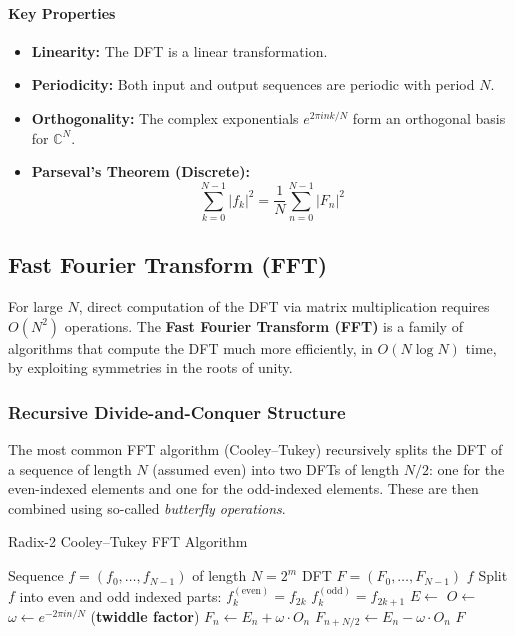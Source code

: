 \paragraph{Key Properties}
\begin{itemize}
    \item \textbf{Linearity:} The DFT is a linear transformation.
    \item \textbf{Periodicity:} Both input and output sequences are periodic with period $N$.
    \item \textbf{Orthogonality:} The complex exponentials $e^{2\pi i n k / N}$ form an orthogonal basis for $\mathbb{C}^N$.
    \item \textbf{Parseval's Theorem (Discrete):}
          \[
              \sum_{k=0}^{N-1} |f_k|^2 = \frac{1}{N} \sum_{n=0}^{N-1} |F_n|^2
          \]
\end{itemize}

\subsection{Fast Fourier Transform (FFT)}

For large $N$, direct computation of the DFT via matrix multiplication requires $O(N^2)$ operations. The \textbf{Fast Fourier Transform (FFT)} is a family of algorithms that compute the DFT much more efficiently, in $O(N \log N)$ time, by exploiting symmetries in the roots of unity.

\subsubsection{Recursive Divide-and-Conquer Structure}
The most common FFT algorithm (Cooley--Tukey) recursively splits the DFT of a sequence of length $N$ (assumed even) into two DFTs of length $N/2$: one for the even-indexed elements and one for the odd-indexed elements. These are then combined using so-called \emph{butterfly operations}.

\begin{algorithm}[H]
    \caption{Radix-2 Cooley--Tukey FFT Algorithm}
    \begin{algorithmic}[1]
        \Require Sequence $f = (f_0, \ldots, f_{N-1})$ of length $N = 2^m$
        \Ensure DFT $F = (F_0, \ldots, F_{N-1})$
        \State \Return $f$
        \Else
        \State Split $f$ into even and odd indexed parts:
        \State $f^{(\mathrm{even})}_k = f_{2k}$
        \State $f^{(\mathrm{odd})}_k = f_{2k+1}$
        \State $E \gets$ 
        \State $O \gets$ 
        \State $\omega \gets e^{-2\pi i n / N}$ \hfill (\textbf{twiddle factor})
        \State $F_n \gets E_n + \omega \cdot O_n$
        \State $F_{n+N/2} \gets E_n - \omega \cdot O_n$
        \EndFor
        \State \Return $F$
        \EndIf
        \EndFunction
    \end{algorithmic}
\end{algorithm}

